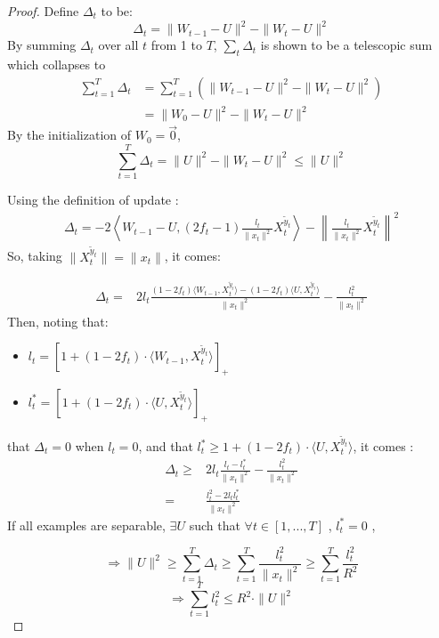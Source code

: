 \documentclass[preprint,12pt,authoryear]{elsarticle}
\begin{document}
\begin{proof}
	Define $\Delta_t$ to be:
	\[\Delta_t = \parallel{W_{t-1}-U}\parallel^2-\parallel{W_t-U}\parallel^2\]
	By summing $\Delta_t$ over all $t$ from 1 to $T$,  $\sum_t \Delta_t$ is shown to be a telescopic sum which collapses to
	\begin{align}
	\sum_{t=1}^{T}\Delta_t &= \sum_{t=1}^{T} \left( \parallel{W_{t-1} - U}\parallel^2-\parallel{W_t - U}\parallel^2 \right)\nonumber\\ 
	&= \parallel{W_0 - U}\parallel^2-\parallel{W_t-U}\parallel^2\nonumber
	\end{align}	
	By the initialization of $W_0 = \vec{0}$, 
	\begin{equation}
	\label{equa:delta}
	\sum_{t=1}^{T}\Delta_t = \parallel{U}\parallel^2 - \parallel{W_t-U}\parallel^2 \leqslant \parallel{U}\parallel^2 
	\end{equation}
	
	Using the definition of update : %
	\begin{align}
	\Delta_t = -2\left\langle W_{t-1} - U, (2f_t-1)\frac{l_t}{\parallel{x_t}\parallel^2}X_t^{\tilde{y}_t}\right\rangle 
	- \left\| \frac{l_t}{\parallel{x_t}\parallel^2}X_t^{\tilde{y}_t}\right\|^2
	\nonumber
	\end{align}
	So, taking $\parallel{X_t^{\tilde{y}_t}}\parallel = \parallel x_t\parallel$, it comes:

	\begin{align}
	\Delta_t =& 2l_t\frac{(1-2f_t)\langle W_{t-1}, X_t^{\tilde{y}_t}\rangle - (1-2f_t)\langle U, X_t^{\tilde{y}_t}\rangle}{\|x_t\|^2}
	-\frac{l_t^2}{\parallel{x_t}\parallel^2}\nonumber
	\end{align}
	Then, noting that:
		\begin{itemize}
			\item[] $l_t = [1+(1-2f_t)\cdot\langle W_{t-1},X_t^{\tilde{y}_t}\rangle]_+$
			\item[] $l_t^{\ast} = [1+(1-2f_t)\cdot\langle U,X_t^{\tilde{y}_t}\rangle]_+$
		\end{itemize}
		that $\Delta_t = 0$ when $l_t = 0$, and that $l^*_t \geq  1+(1-2f_t)\cdot\langle U,X_t^{\tilde{y}_t}\rangle$, it comes : 
	\begin{align}
	\Delta_t\geqslant& 2l_t\frac{l_t - l_t^{\ast}}{\parallel{x_t}\parallel^2}-\frac{l_t^2}{\parallel{x_t}\parallel^2}\nonumber\\
	=& \frac{l_t^2-2l_t l_t^{\ast}}{\parallel x_t\parallel^2}\nonumber
	\end{align}
	If all examples are separable, $\exists U$ such that $\forall t \in [1,...,T]$ , $l_t^{\ast} = 0$ ,
	
	\[\Rightarrow \parallel{U}\parallel^2 \geqslant \sum_{t=1}^{T}\Delta_t \geqslant \sum_{t=1}^{T}  \frac{l_t^2}{\parallel{x_t}\parallel^2}
	\geqslant 
	\sum_{t=1}^{T}  \frac{l_t^2}{R^2}
	\]
	\[\Rightarrow\sum_{t=1}^{T} l_t^2 \leqslant R^2 \cdot \parallel{U}\parallel^2\]
\end{proof}
\end{document}
